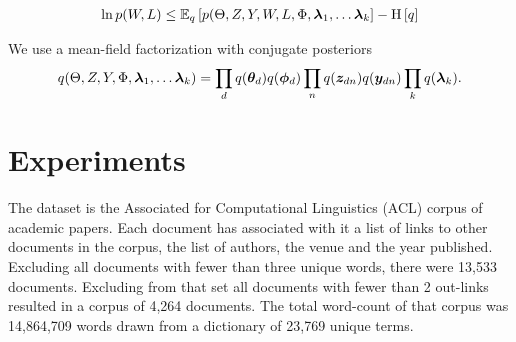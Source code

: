 \begin{align}
\ln p(W, L) \leq \ex{p(\Theta, Z, Y, W, L, \Phi, \vv{\lambda}_1, \ldots \vv{\lambda}_k}{q} - \ent{q}
\end{align}

We use a mean-field factorization with conjugate posteriors
\begin{align}
q(\Theta, Z, Y, \Phi, \vv{\lambda}_1, \ldots \vv{\lambda}_k) = \prod_d q(\thd)q(\vv{\phi}_d)\prod_n q(\vv{z}_{dn})q(\vv{y}_{dn}) \prod_k q(\vv{\lambda}_k).
\end{align}




\section{Experiments}
The dataset is the Associated for Computational Linguistics (ACL) corpus of academic papers. Each document has associated with it a list of links to other documents in the corpus, the list of authors, the venue and the year published. Excluding all documents with fewer than three unique words, there were 13,533 documents. Excluding from that set all documents with fewer than 2 out-links resulted in a corpus of 4,264 documents. The total word-count of that corpus was 14,864,709 words drawn from a dictionary of 23,769 unique terms.




